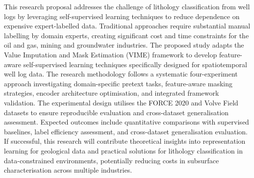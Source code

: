 
\noindent
This research proposal addresses the challenge of lithology classification from well logs by leveraging self-supervised learning techniques to reduce dependence on expensive expert-labelled data. Traditional approaches require substantial manual labelling by domain experts, creating significant cost and time constraints for the oil and gas, mining and groundwater industries. The proposed study adapts the Value Imputation and Mask Estimation (VIME) framework to develop feature-aware self-supervised learning techniques specifically designed for spatiotemporal well log data. The research methodology follows a systematic four-experiment approach investigating domain-specific pretext tasks, feature-aware masking strategies, encoder architecture optimisation, and integrated framework validation. The experimental design utilises the FORCE 2020 and Volve Field datasets to ensure reproducible evaluation and cross-dataset generalisation assessment. Expected outcomes include quantitative comparisons with supervised baselines, label efficiency assessment, and cross-dataset generalisation evaluation. If successful, this research will contribute theoretical insights into representation learning for geological data and practical solutions for lithology classification in data-constrained environments, potentially reducing costs in subsurface characterisation across multiple industries.
